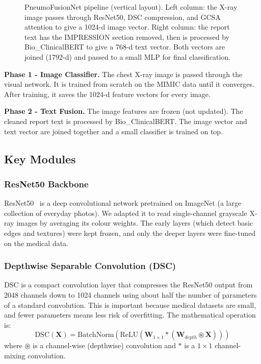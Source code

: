\documentclass{article}
\begin{document}
\begin{figure}[h]
\caption{PneumoFusionNet pipeline (vertical layout). Left column: the X-ray
image passes through ResNet50, DSC compression, and GCSA attention to give a
1024-d image vector. Right column: the report text has the IMPRESSION section
removed, then is processed by Bio\_ClinicalBERT to give a 768-d text vector.
Both vectors are joined (1792-d) and passed to a small MLP for final classification.}
\label{fig:pipeline}
\end{figure}

\textbf{Phase 1 - Image Classifier.}
The chest X-ray image is passed through the visual network. It is trained
from scratch on the MIMIC data until it converges. After training, it
saves the 1024-d feature vectors for every image.

\textbf{Phase 2 - Text Fusion.}
The image features are frozen (not updated). The cleaned report text is
processed by Bio\_ClinicalBERT. The image vector and text vector are
joined together and a small classifier is trained on top.

\subsection{Key Modules}

\subsubsection{ResNet50 Backbone}

ResNet50~\cite{he2016resnet} is a deep convolutional network pretrained on
ImageNet (a large collection of everyday photos). We adapted it to read
single-channel grayscale X-ray images by averaging its colour weights.
The early layers (which detect basic edges and textures) were kept frozen,
and only the deeper layers were fine-tuned on the medical data.

\subsubsection{Depthwise Separable Convolution (DSC)}

DSC is a compact convolution layer that compresses the ResNet50 output from
2048 channels down to 1024 channels using about half the number of
parameters of a standard convolution. This is important because medical
datasets are small, and fewer parameters means less risk of overfitting.
The mathematical operation is:
\begin{equation}
  \text{DSC}(\mathbf{X}) =
  \text{BatchNorm}\!\left(\text{ReLU}\!\left(
    \mathbf{W}_{1\times1} \ast (\mathbf{W}_{depth} \circledast \mathbf{X})
  \right)\right)
  \label{eq:dsc}
\end{equation}
where $\circledast$ is a channel-wise (depthwise) convolution and
$\ast$ is a $1\times1$ channel-mixing convolution.
\end{document}
